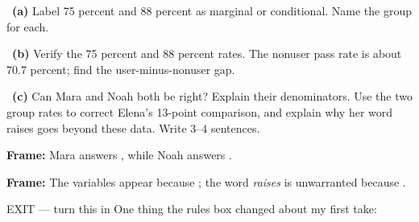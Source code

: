 \documentclass[11pt]{article}
\begin{document}
~\textbf{(a)} Label 75 percent and 88 percent as marginal or conditional. Name the group for each.\par
\workspace{0.7in}

~\textbf{(b)} Verify the 75 percent and 88 percent rates. The nonuser pass rate is about 70.7 percent; find the user-minus-nonuser gap.\par
\workspace{1.4in}

~\textbf{(c)} Can Mara and Noah both be right? Explain their denominators. Use the two group rates to correct Elena's 13-point comparison, and explain why her word raises goes beyond these data. Write 3--4 sentences.\par
\workspace{2.0in}

\begin{sentenceframebox}\raggedright\textbf{Frame:} Mara answers \blank[2.1in], while Noah answers \blank[2.1in].\end{sentenceframebox}

\begin{sentenceframebox}\raggedright\textbf{Frame:} The variables appear \blank[0.8in] because \blank[2.1in]; the word \emph{raises} is unwarranted because \blank[2.0in].\end{sentenceframebox}

\begin{summaryexitbox}{EXIT --- turn this in}
One thing the rules box changed about my first take: \hrulefill\par
\workspace{0.4in}
\end{summaryexitbox}
\end{document}
